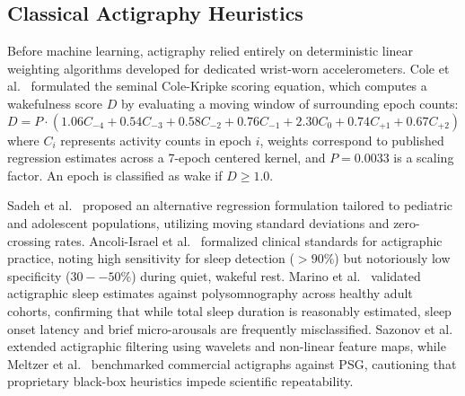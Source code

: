 \documentclass[journal,11pt,onecolumn]{IEEEtran}
\begin{document}
\subsection{Classical Actigraphy Heuristics}
Before machine learning, actigraphy relied entirely on deterministic linear weighting algorithms developed for dedicated wrist-worn accelerometers. Cole et al.~\cite{cole1992automatic} formulated the seminal Cole-Kripke scoring equation, which computes a wakefulness score $D$ by evaluating a moving window of surrounding epoch counts:
\begin{equation}
\label{eq:cole_kripke}
D = P \cdot \left( 1.06 C_{-4} + 0.54 C_{-3} + 0.58 C_{-2} + 0.76 C_{-1} + 2.30 C_0 + 0.74 C_{+1} + 0.67 C_{+2} \right)
\end{equation}
where $C_i$ represents activity counts in epoch $i$, weights correspond to published regression estimates across a 7-epoch centered kernel, and $P = 0.0033$ is a scaling factor. An epoch is classified as wake if $D \ge 1.0$. 

Sadeh et al.~\cite{sadeh1994activity} proposed an alternative regression formulation tailored to pediatric and adolescent populations, utilizing moving standard deviations and zero-crossing rates. Ancoli-Israel et al.~\cite{ancoli2003role} formalized clinical standards for actigraphic practice, noting high sensitivity for sleep detection ($>90\%$) but notoriously low specificity ($30--50\%$) during quiet, wakeful rest. Marino et al.~\cite{marino2013measuring} validated actigraphic sleep estimates against polysomnography across healthy adult cohorts, confirming that while total sleep duration is reasonably estimated, sleep onset latency and brief micro-arousals are frequently misclassified. Sazonov et al.~\cite{sazonov2004activity} extended actigraphic filtering using wavelets and non-linear feature maps, while Meltzer et al.~\cite{meltzer2014use} benchmarked commercial actigraphs against PSG, cautioning that proprietary black-box heuristics impede scientific repeatability.
\end{document}
